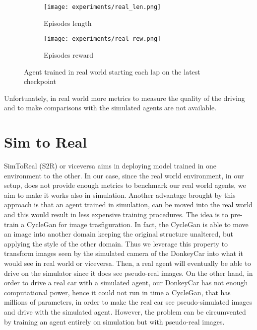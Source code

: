 \begin{figure}[h]
  \centering
  \begin{subfigure}{.5\linewidth}
      \centering
      \texttt{[image: experiments/real\_len.png]}
      \caption{Episodes length}\label{fig:rlen}
  \end{subfigure}%
      \hfill
  \begin{subfigure}{.5\linewidth}
      \centering
      \texttt{[image: experiments/real\_rew.png]}
      \caption{Episodes reward}\label{fig:rrew}
  \end{subfigure}
  \caption{Agent trained in real world starting each lap on the latest checkpoint}
  \label{fig:realresult}
\end{figure}

Unfortunately, in real world more metrics to measure the quality of the driving and to make comparisons with the simulated agents are not available. 

\section{Sim to Real}

SimToReal (S2R) or viceversa aims in deploying model trained in one environment to the other. In our case, since the real world environment, in our setup, does not provide enough metrics to benchmark our real world agents, we aim to make it works also in simulation. Another advantage brought by this approach is that an agent trained in simulation, can be moved into the real world and this would result in less expensive training procedures. The idea is to pre-train a CycleGan \citep{CycleGAN2017} for image trasfiguration. In fact, the CycleGan is able to move an image into another domain keeping the original structure unaltered, but applying the style of the other domain. Thus we leverage this property to transform images seen by the simulated camera of the DonkeyCar into what it would see in real world or viceversa. Then, a real agent will eventually be able to drive on the simulator since it does see pseudo-real images. On the other hand, in order to drive a real car with a simulated agent, our DonkeyCar has not enough computational power, hence it could not run in time a CycleGan, that has millions of parameters, in order to make the real car see pseudo-simulated images and drive with the simulated agent. However, the problem can be circumvented by training an agent entirely on simulation but with pseudo-real images.